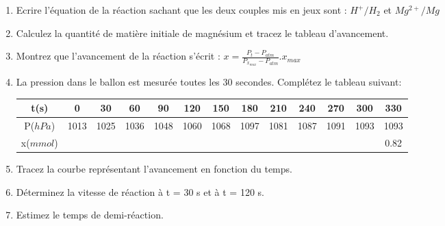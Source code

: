 \documentclass[12pt]{article}
\begin{document}
\begin{enumerate}
  \item Ecrire l'équation de la réaction sachant que les deux couples mis en jeux sont : $H^+/H_2$ et $Mg^{2+}/Mg$
  \item Calculez la quantité de matière initiale de magnésium et tracez le tableau d’avancement.
  \item Montrez que l'avancement de la réaction s'écrit : \(x = \frac{P_t-P_{atm}}{P_{x_{max}}-P_{atm}}.x_{max}\)
  \item La pression dans le ballon est mesurée toutes les 30 secondes. Complétez le tableau suivant:
	      \begin{center}
		      \begin{tabular}{|c|c|c|c|c|c|c|c|c|c|c|c|c|}
			      \hline
			      t(s)      & 0    & 30   & 60   & 90   & 120  & 150  & 180  & 210  & 240  & 270  & 300  & 330  \\\hline
			      P($hPa$)  & 1013 & 1025 & 1036 & 1048 & 1060 & 1068 & 1097 & 1081 & 1087 & 1091 & 1093 & 1093 \\\hline
			      x($mmol$) &     &  &  &  &  &  &  &   &  &   &  & 0.82 \\\hline
		      \end{tabular}
	      \end{center}

		      \item Tracez la courbe représentant l'avancement en fonction du temps.
          \item Déterminez la vitesse de réaction à t = 30 s et à t = 120 s.
          \item Estimez le temps de demi-réaction.
\end{enumerate}


\end{document}
